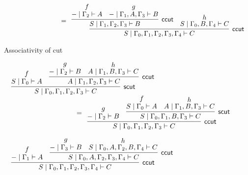 \documentclass[sn-mathphys-num]{sn-jnl}%
\newcommand{\GG}{\Gamma}
\newcommand{\vd}{\vdash}
\newcommand{\mf}[1]{\mathsf{#1}}
\theoremstyle{thmstyleone}%
\theoremstyle{thmstyletwo}%
\theoremstyle{thmstylethree}%
\begin{document}
\begin{figure}
\begin{displaymath}
\begin{array}{l}
\begin{array}{c}
      \end{array}
      \\[20pt]
      \qquad \qquad \qquad \qquad   =
      \begin{array}{c}
        \infer[\mf{ccut}]{S \mid \GG_0 , \GG_1 , \GG_2 , \GG_3 , \GG_4 \vd C}{
        \infer[\mf{ccut}]{S \mid \GG_1 , \GG_2 , \GG_3 \vd B}{
        \deduce{{-} \mid \GG_2 \vd A}{f}
        &
        \deduce{{-} \mid \GG_1 , A , \GG_3 \vd B}{g}
        }
        &
        \deduce{S \mid \GG_0 , B , \GG_4 \vd C}{h}
        }
      \end{array}
    \end{array}
  \end{displaymath}
  \caption{Associativity of cut}
  \label{fig:asscut}
\end{figure}

\begin{figure}
  \begin{displaymath}
    \begin{array}{l}
      \begin{array}{c}
        \infer[\mf{scut}]{S \mid \GG_0, \GG_1 , \GG_2 , \GG_3 \vd C}{
        \deduce{S \mid \GG_0 \vd A}{f}
        &
        \infer[\mf{ccut}]{A \mid \GG_1 , \GG_2 , \GG_3 \vd C}{
        \deduce{{-} \mid \GG_2 \vd B}{g}
        &
        \deduce{A \mid \GG_1 , B , \GG_3 \vd C}{h}
        }
        }
      \end{array}
      \\[10pt]
      \qquad \qquad \qquad \qquad \qquad  =
      \begin{array}{c}
        \infer[\mf{ccut}]{S \mid \GG_0, \GG_1 , \GG_2 , \GG_3 \vd C}{
        \deduce{{-} \mid \GG_2 \vd B}{g}
        &
        \infer[\mf{scut}]{S \mid \GG_0 , \GG_1 , B , \GG_3 \vd C}{
        \deduce{S \mid \GG_0 \vd A}{f}
        &
        \deduce{A \mid \GG_1 , B , \GG_3 \vd C}{h}
        }
        }
      \end{array}
      \\[30pt]
      \begin{array}{c}
        \infer[\mf{ccut}]{S \mid \GG_0 , \GG_1 , \GG_2 , \GG_3 , \GG_4 \vd C}{
        \deduce{{-} \mid \GG_1 \vd A}{f}
        &
        \infer[\mf{ccut}]{S \mid \GG_0 , A , \GG_2 , \GG_3 , \GG_4 \vd C}{
        \deduce{{-} \mid \GG_3 \vd B}{g}
        &
        \deduce{S \mid \GG_0 , A , \GG_2 , B , \GG_4 \vd C}{h}
        }
        }
      \end{array}
      \\[10pt]

\end{array}
\end{displaymath}
\end{figure}
\end{document}
